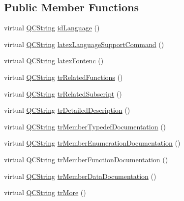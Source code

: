 \subsection*{Public Member Functions}
\begin{DoxyCompactItemize}
\item 
virtual \mbox{\hyperlink{class_q_c_string}{Q\+C\+String}} \mbox{\hyperlink{class_translator_serbian_cyrillic_aeeb4b73fec8f2f8df4df12738893b200}{id\+Language}} ()
\item 
virtual \mbox{\hyperlink{class_q_c_string}{Q\+C\+String}} \mbox{\hyperlink{class_translator_serbian_cyrillic_a68646868262f568aa5d23fa4fd094a15}{latex\+Language\+Support\+Command}} ()
\item 
virtual \mbox{\hyperlink{class_q_c_string}{Q\+C\+String}} \mbox{\hyperlink{class_translator_serbian_cyrillic_a6c20ea532f61ab33968dbb951299fc6b}{latex\+Fontenc}} ()
\item 
virtual \mbox{\hyperlink{class_q_c_string}{Q\+C\+String}} \mbox{\hyperlink{class_translator_serbian_cyrillic_adc1f4d26bb85ea1be22c2092b2d21783}{tr\+Related\+Functions}} ()
\item 
virtual \mbox{\hyperlink{class_q_c_string}{Q\+C\+String}} \mbox{\hyperlink{class_translator_serbian_cyrillic_a1c9921cc810aa49a9d19a4fbdb034e8d}{tr\+Related\+Subscript}} ()
\item 
virtual \mbox{\hyperlink{class_q_c_string}{Q\+C\+String}} \mbox{\hyperlink{class_translator_serbian_cyrillic_aea457c0ab51df7694f0070e34bb6309d}{tr\+Detailed\+Description}} ()
\item 
virtual \mbox{\hyperlink{class_q_c_string}{Q\+C\+String}} \mbox{\hyperlink{class_translator_serbian_cyrillic_a752841f3a2514a9fa1c47244903e4712}{tr\+Member\+Typedef\+Documentation}} ()
\item 
virtual \mbox{\hyperlink{class_q_c_string}{Q\+C\+String}} \mbox{\hyperlink{class_translator_serbian_cyrillic_a9f5755ce6f2841cca1744a056318fc48}{tr\+Member\+Enumeration\+Documentation}} ()
\item 
virtual \mbox{\hyperlink{class_q_c_string}{Q\+C\+String}} \mbox{\hyperlink{class_translator_serbian_cyrillic_a36eb139bb421a0c0a269d97d5da81798}{tr\+Member\+Function\+Documentation}} ()
\item 
virtual \mbox{\hyperlink{class_q_c_string}{Q\+C\+String}} \mbox{\hyperlink{class_translator_serbian_cyrillic_a9abe011418662c8a690e4a36d70057bb}{tr\+Member\+Data\+Documentation}} ()
\item 
virtual \mbox{\hyperlink{class_q_c_string}{Q\+C\+String}} \mbox{\hyperlink{class_translator_serbian_cyrillic_a93da2b0552deac88efa773051690e57b}{tr\+More}} ()

\end{DoxyCompactItemize}
